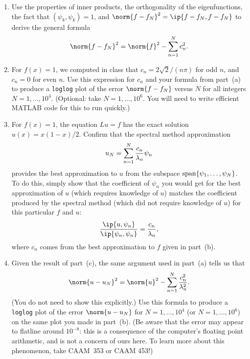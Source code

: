 \begin{enumerate}
\item Use the properties of inner products, the orthogonality of the
      eigenfunctions, the fact that $(\psi_k, \psi_k) = 1$, and
      $\norm{f-f_N}^2 = \ip{f-f_N, f-f_N}$ to derive the general formula
      \[ \norm{f-f_N}^2  = \norm{f}^2 - \sum_{n=1}^N c_n^2.\]
\item For $f(x) = 1$, we computed in class that 
      $c_n = 2\sqrt{2}/(n \pi)$ for odd $n$, and $c_n = 0$ for even $n$.
      Use this expression for $c_n$ and your formula from part~(a) to produce 
      a \verb|loglog| plot of the error $\norm{f-f_N}$ versus $N$ for 
      all integers $N = 1, \ldots, 10^4$.  (Optional: take $N=1,\ldots, 10^6$.
      You will need to write efficient MATLAB code for this to run quickly.)
\item For $f(x) = 1$, the equation $Lu = f$ has the exact solution $u(x) = x(1-x)/2$.
      Confirm that the spectral method approximation
      \[ u_N = \sum_{n=1}^N {c_n \over \lambda_n} \psi_n\] 
      provides the best approximation to $u$ from the
      subspace ${\rm span}\{\psi_1, \ldots, \psi_N\}$.  To do this, simply show that
      the coefficient of $\psi_n$ you would get for the best approximation of $u$ 
      (which requires knowledge of $u$) matches the coefficient produced by the 
      spectral method (which did not require knowledge of $u$) for this particular 
      $f$ and $u$:
          \[ {\ip{u, \psi_n} \over \ip{\psi_n,\psi_n}} = {c_n \over \lambda_n},\]
      where $c_n$ comes from the best approximation to $f$ given in part~(b).

\item Given the result of part~(c), the same argument used in part~(a) tells us that 
      \[ \norm{u - u_N}^{2} = \norm{u}^2 - \sum_{n=1}^N {c_n^2 \over \lambda_n^2}.\]
      (You do not need to show this explicitly.)  Use this formula to produce a 
      \verb|loglog| plot of the error $\norm{u-u_N}$ for $N=1,\ldots, 10^4$ 
      (or $N=1,\ldots, 10^6$) on the same plot you made in part~(b).  
      (Be aware that the error may appear to flatline 
      around $10^{-8}$: this is a consequence of the computer's floating point
      arithmetic, and is not a concern of ours here.  To learn more about this
      phenomenon, take CAAM~353 or CAAM 453!)
 
\end{enumerate}


